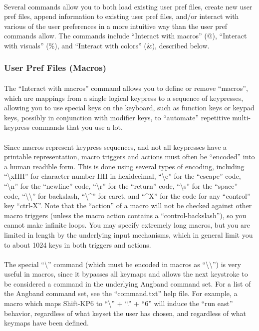 \paragraph{}Several commands allow you to both load existing user pref
files, create new user pref files, append information to existing user
pref files, and/or interact with various of the user preferences in a
more intuitive way than the user pref commands allow. The commands
include ``Interact with macros'' (@), ``Interact with visuals'' (\%),
and ``Interact with colors'' (\&), described below.

\subsubsection{User Pref Files (Macros)}
\paragraph{}The ``Interact with macros'' command allows you to define or remove
``macros'', which are mappings from a single logical keypress to a sequence
of keypresses, allowing you to use special keys on the keyboard, such as
function keys or keypad keys, possibly in conjunction with modifier keys,
to ``automate'' repetitive multi-keypress commands that you use a lot.

\paragraph{}Since macros represent keypress sequences, and not all
keypresses have a printable representation, macro triggers and actions
must often be ``encoded'' into a human readible form. This is done using
several types of encoding, including ``\textbackslash xHH'' for
character number HH in hexidecimal, ``\textbackslash e'' for the
``escape'' code, ``\textbackslash n'' for the ``newline'' code,
``\textbackslash r'' for the ``return'' code, ``\textbackslash s'' for
the ``space'' code, ``\textbackslash\textbackslash '' for backslash,
``\textbackslash \^{}'' for caret, and ``\^{}X'' for the code for any
``control'' key ``ctrl-X''.  Note that the ``action'' of a macro will
not be checked against other macro triggers (unless the macro action
contains a ``control-backslash''), so you cannot make infinite loops.
You may specify extremely long macros, but you are limited in length by
the underlying input mechanisms, which in general limit you to about
1024 keys in both triggers and actions.

\paragraph{}The special ``\textbackslash'' command (which must be
encoded in macros as ``\textbackslash\textbackslash'') is very useful in
macros, since it bypasses all keymaps and allows the next keystroke to
be considered a command in the underlying Angband command set.  For a
list of the Angband command set, see the ``command.txt'' help file.  For
example, a macro which maps Shift-KP6 to ``\textbackslash '' + ``.'' +
``6'' will induce the ``run east'' behavior, regardless of what keyset
the user has chosen, and regardless of what keymaps have been defined.


